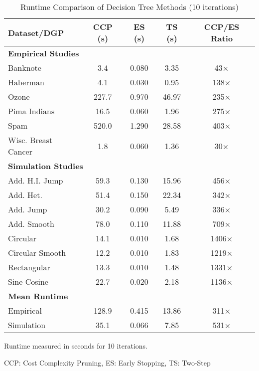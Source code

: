 \begin{table}[htbp]
\centering
\caption{Runtime Comparison of Decision Tree Methods (10 iterations)}
\label{tab:runtime_comparison}
\begin{tabular}{lcccc}
\hline
Dataset/DGP & CCP (s) & ES (s) & TS (s) & CCP/ES Ratio \\
\hline
\multicolumn{5}{l}{\textbf{Empirical Studies}} \\
Banknote & 3.4 & 0.080 & 3.35 & 43× \\
Haberman & 4.1 & 0.030 & 0.95 & 138× \\
Ozone & 227.7 & 0.970 & 46.97 & 235× \\
Pima Indians & 16.5 & 0.060 & 1.96 & 275× \\
Spam & 520.0 & 1.290 & 28.58 & 403× \\
Wisc. Breast Cancer & 1.8 & 0.060 & 1.36 & 30× \\
\hline
\multicolumn{5}{l}{\textbf{Simulation Studies}} \\
Add. H.I. Jump & 59.3 & 0.130 & 15.96 & 456× \\
Add. Het. & 51.4 & 0.150 & 22.34 & 342× \\
Add. Jump & 30.2 & 0.090 & 5.49 & 336× \\
Add. Smooth & 78.0 & 0.110 & 11.88 & 709× \\
Circular & 14.1 & 0.010 & 1.68 & 1406× \\
Circular Smooth & 12.2 & 0.010 & 1.83 & 1219× \\
Rectangular & 13.3 & 0.010 & 1.48 & 1331× \\
Sine Cosine & 22.7 & 0.020 & 2.18 & 1136× \\
\hline
\multicolumn{5}{l}{\textbf{Mean Runtime}} \\
Empirical & 128.9 & 0.415 & 13.86 & 311× \\
Simulation & 35.1 & 0.066 & 7.85 & 531× \\
\hline
\end{tabular}
\begin{tablenotes}
\item Runtime measured in seconds for 10 iterations.
\item CCP: Cost Complexity Pruning, ES: Early Stopping, TS: Two-Step
\end{tablenotes}
\end{table}